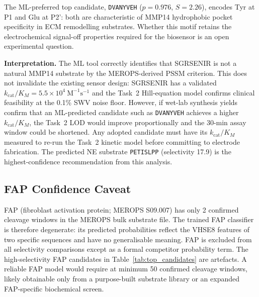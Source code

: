 \documentclass[10pt,a4paper]{article}
\begin{document}
The ML-preferred top candidate, \texttt{DVANYVEH} ($p = 0.976$, $S = 2.26$), encodes
Tyr at P1 and Glu at P2': both are characteristic of MMP14 hydrophobic pocket specificity
in ECM remodelling substrates. Whether this motif retains the electrochemical signal-off
properties required for the biosensor is an open experimental question.

\begin{tcolorbox}[colback=gray!7, colframe=gray!40, boxrule=0.4pt,
  arc=2pt, left=6pt, right=6pt, top=4pt, bottom=4pt]
  \textbf{Interpretation.} The ML tool correctly identifies that SGRSENIR is not a
  natural MMP14 substrate by the MEROPS-derived PSSM criterion. This does not
  invalidate the existing sensor design: SGRSENIR has a validated
  $k_\text{cat}/K_M = 5.5 \times 10^4\ \text{M}^{-1}\text{s}^{-1}$ and the Task~2
  Hill-equation model confirms clinical feasibility at the 0.1\% SWV noise floor.
  However, if wet-lab synthesis yields confirm that an ML-predicted candidate such as
  \texttt{DVANYVEH} achieves a higher $k_\text{cat}/K_M$, the Task~2 LOD would improve
  proportionally and the 30-min assay window could be shortened. Any adopted candidate
  must have its $k_\text{cat}/K_M$ measured to re-run the Task~2 kinetic model before
  committing to electrode fabrication. The predicted NE substrate \texttt{PETISLPP}
  (selectivity 17.9) is the highest-confidence recommendation from this analysis.
\end{tcolorbox}

\subsection{FAP Confidence Caveat}\label{sec:fap}

FAP (fibroblast activation protein; MEROPS S09.007) has only 2 confirmed cleavage windows
in the MEROPS bulk substrate file. The trained FAP classifier is therefore degenerate: its
predicted probabilities reflect the VHSE8 features of two specific sequences and have no
generalisable meaning. FAP is excluded from all selectivity comparisons except as a formal
competitor probability term. The high-selectivity FAP candidates in Table~\ref{tab:top_candidates}
are artefacts. A reliable FAP model would require at minimum 50 confirmed cleavage windows,
likely obtainable only from a purpose-built substrate library or an expanded FAP-specific
biochemical screen.
\end{document}

